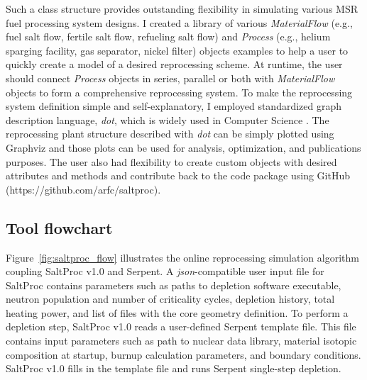 Such a class structure provides outstanding flexibility in simulating 
various \gls{MSR} fuel processing system designs. I created a library of 
various \textit{MaterialFlow} (e.g., fuel salt flow, fertile salt flow, 
refueling salt flow) and \textit{Process} (e.g., helium sparging facility, gas 
separator, nickel filter) objects examples to help a user to 
quickly create a model of a desired reprocessing scheme. At runtime, the user
should connect \textit{Process} objects in series, parallel or both with 
\textit{MaterialFlow} objects to form a comprehensive reprocessing system. To 
make the reprocessing system definition simple and self-explanatory, I 
employed standardized graph description language, \emph{dot}, which is widely 
used in Computer Science \cite{koutsofios_drawing_1996}. The reprocessing 
plant structure described with \emph{dot} can be simply plotted using Graphviz 
\cite{ellson_graphviz_2003} and those plots can be used for analysis, 
optimization, and publications purposes. The user also had flexibility to 
create custom objects with desired attributes and methods and contribute back 
to the code package using GitHub (https://github.com/arfc/saltproc).	

\subsection{Tool flowchart}
Figure~\ref{fig:saltproc_flow} illustrates the online reprocessing simulation 
algorithm coupling SaltProc v1.0 and Serpent. A \emph{json}-compatible 
user input file for SaltProc contains parameters such as paths to depletion 
software executable, neutron population and number of criticality cycles, 
depletion history, total heating power, and list of files with the core 
geometry definition. To perform a depletion step, SaltProc v1.0 reads a 
user-defined Serpent template file. This file contains input parameters such 
as path to nuclear data library, material isotopic composition at startup, 
burnup calculation parameters, and boundary conditions. SaltProc v1.0 
fills in 
the template file and runs Serpent single-step depletion. 

